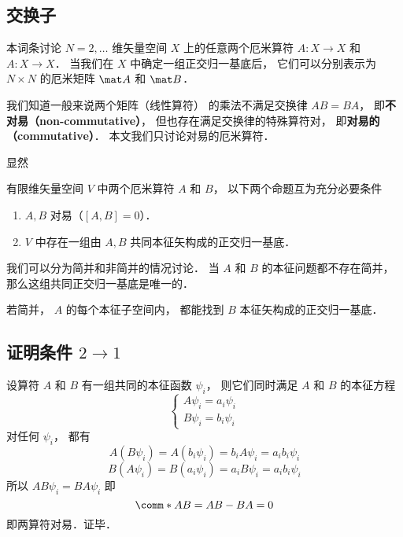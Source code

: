 


\subsection{交换子}
本词条讨论 $N = 2, \dots$ 维矢量空间 $X$ 上的任意两个厄米算符 $A: X \to X$ 和 $A: X \to X$． 当我们在 $X$ 中确定一组正交归一基底后， 它们可以分别表示为 $N \times N$ 的厄米矩阵 $\mat A$ 和 $\mat B$．

我们知道一般来说两个矩阵（线性算符）%
的乘法不满足交换律 $AB = BA$， 即\textbf{不对易（non-commutative）}， 但也存在满足交换律的特殊算符对， 即\textbf{对易的（commutative）}． 本文我们只讨论对易的厄米算符．

显然

\begin{theorem}{}
有限维矢量空间 $V$ 中两个厄米算符 $A$ 和 $B$， 以下两个命题互为充分必要条件
\begin{enumerate}
\item $A,B$ 对易（$[A,B] = 0$）．
\item $V$ 中存在一组由 $A, B$ 共同本征矢构成的正交归一基底．
\end{enumerate}
\end{theorem}

我们可以分为简并和非简并的情况讨论． 当 $A$ 和 $B$ 的本征问题都不存在简并， 那么这组共同正交归一基底是唯一的．

若简并， $A$ 的每个本征子空间内， 都能找到 $B$ 本征矢构成的正交归一基底．

\subsection{证明条件 $2 \to 1$}
设算符 $A$ 和 $B$ 有一组共同的本征函数 $\psi_i$，  则它们同时满足 $A$ 和 $B$ 的本征方程
\begin{equation}
\begin{cases}
A \psi_i = a_i \psi_i\\
B \psi_i = b_i \psi_i
\end{cases}
\end{equation}
对任何 $\psi_i$，  都有
\begin{equation}
A (B \psi_i) = A (b_i \psi_i) = b_iA \psi_i = a_i b_i \psi_i
\end{equation}
\begin{equation}
B (A \psi_i) = B (a_i \psi_i) = a_i B \psi_i = a_i b_i \psi_i
\end{equation}
所以 $AB \psi_i = BA \psi_i$ 即
\begin{equation}
\comm*{A}{B} = AB - BA = 0
\end{equation}
即两算符对易．证毕．

